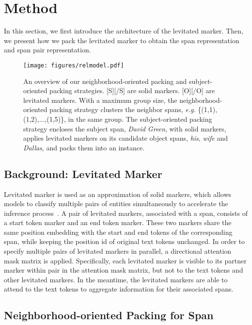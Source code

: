 \documentclass[11pt]{article}
\begin{document}
\section{Method}
In this section, we first introduce the architecture of the levitated marker. Then, we present how we pack the levitated marker to obtain the span representation and  span pair representation.



\begin{figure*}[!t]
    \centering
    \texttt{[image: figures/relmodel.pdf]}
\caption{An overview of our neighborhood-oriented packing and subject-oriented packing strategies. [S][/S] are solid markers. [O][/O] are levitated markers. With a maximum group size, the neighborhood-oriented packing strategy clusters the neighbor spans, \emph{e.g.} \{(1,1),(1,2),...,(1,5)\}, in the same group.  The subject-oriented packing strategy encloses the subject span, \emph{David Green}, with solid markers, applies levitated markers on its candidate object spans, \emph{his}, \emph{wife} and \emph{Dallas}, and  packs them  into an instance. 
}
    \label{fig:relmodel}
\end{figure*}
\subsection{Background: Levitated Marker}
Levitated marker is used as an approximation of solid markers, which allows models to classify multiple pairs of entities simultaneously to accelerate the inference process~\cite{PURE}.  
A pair of levitated markers, associated with a span, consists of a start token marker and an end token marker. These  two markers share the same position embedding with the start and end tokens of the corresponding span,  while keeping the position id of  original text tokens unchanged. In order to specify multiple pairs of levitated markers in parallel, a directional attention mask matrix is applied. Specifically, each levitated marker is visible to its partner marker within pair in the attention mask matrix, but not to the text tokens and other levitated markers. In the meantime, the levitated markers are able to attend to  the text tokens to aggregate information for their associated spans.  


\subsection{Neighborhood-oriented Packing for Span}
\end{document}
